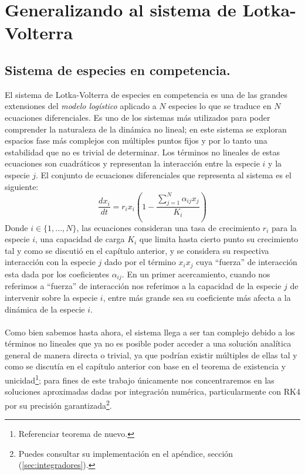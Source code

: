 \chapter{Generalizando al sistema de Lotka-Volterra}

\section{Sistema de especies en competencia.}

El sistema de Lotka-Volterra de especies en competencia es una de las grandes extensiones del \textit{modelo logístico} aplicado a $N$ especies lo que se traduce en $N$ ecuaciones diferenciales. Es uno de los sistemas más utilizados para poder comprender la naturaleza de la dinámica no lineal; en este sistema se exploran espacios fase más complejos con múltiples puntos fijos y por lo tanto una estabilidad que no es trivial de determinar. Los términos no lineales de estas ecuaciones son cuadráticos y representan la interacción entre la especie $i$ y la especie $j$. El conjunto de ecuaciones diferenciales que representa al sistema es el siguiente:
\begin{equation}\label{eqn:LK}
	\frac{dx_i}{dt}=r_ix_i\left(1-\frac{\sum_{j=1}^N \alpha_{ij}x_j}{K_i}\right)
\end{equation}
Donde $i\in\{1,...,N\}$, las ecuaciones consideran una tasa de crecimiento $r_i$ para la especie $i$, una capacidad de carga $K_i$ que limita hasta cierto punto su crecimiento tal y como se discutió en el capítulo anterior, y se considera su respectiva interacción con la especie $j$ dado por el término $x_ix_j$ cuya ``fuerza'' de interacción esta dada por los coeficientes $\alpha_{ij}$. En un primer acercamiento, cuando nos referimos a ``fuerza'' de interacción nos referimos a la capacidad de la especie $j$ de intervenir sobre la especie $i$, entre más grande sea su coeficiente más afecta a la dinámica de la especie $i$.\\
\\
Como bien sabemos hasta ahora, el sistema llega a ser tan complejo debido a los términos no lineales que ya no es posible poder acceder a una solución analítica general de manera directa o trivial, ya que podrían existir múltiples de ellas tal y como se discutía en el capítulo anterior con base en el teorema de existencia y unicidad\footnote{Referenciar teorema de nuevo.}; para fines de este trabajo únicamente nos concentraremos en las soluciones aproximadas dadas por integración numérica, particularmente con RK4 por su precisión garantizada\footnote{Puedes consultar su implementación en el apéndice, sección (\ref{sec:integradores}).}.
